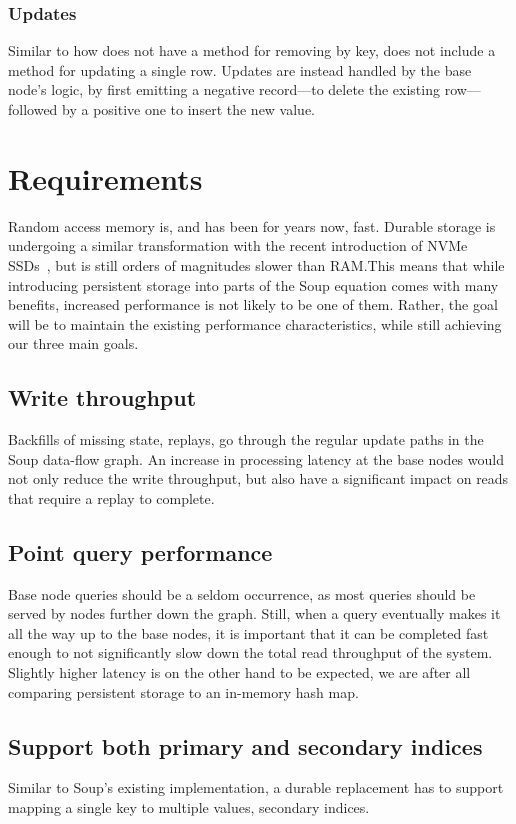 \subsubsection{Updates}
Similar to how  does not have a method for removing by key,
 does not include a method for updating a single row. Updates are
instead handled by the base node's logic, by first emitting a negative
record---to delete the existing row---followed by a positive one to insert the
new value.

\section{Requirements}\label{sec:requirements}
Random access memory is, and has been for years now, fast. Durable storage is
undergoing a similar transformation with the recent introduction of NVMe
SSDs~\cite{nvme}, but is still orders of magnitudes slower than RAM.\@ This
means that while introducing persistent storage into parts of the Soup equation
comes with many benefits, increased performance is not likely to be one of them.
Rather, the goal will be to maintain the existing performance characteristics,
while still achieving our three main goals.

\subsection{Write throughput}
Backfills of missing state, replays, go through the regular update paths in the
Soup data-flow graph. An increase in processing latency at the base nodes would
not only reduce the write throughput, but also have a significant impact on
reads that require a replay to complete.

\subsection{Point query performance}
Base node queries should be a seldom occurrence, as most queries should be
served by nodes further down the graph. Still, when a query eventually makes it
all the way up to the base nodes, it is important that it can be completed fast
enough to not significantly slow down the total read throughput of the system.
Slightly higher latency is on the other hand to be expected, we are after all
comparing persistent storage to an in-memory hash map.

\subsection{Support both primary and secondary indices}
Similar to Soup's existing  implementation, a durable replacement
has to support mapping a single key to multiple values, \ie secondary indices.

